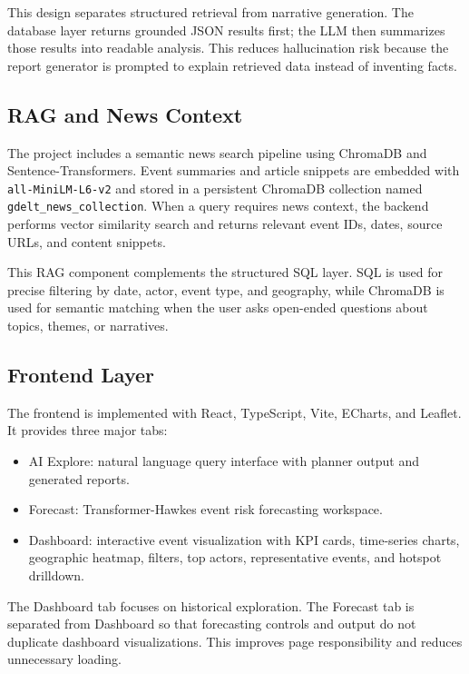\documentclass[11pt]{article}
\begin{document}
This design separates structured retrieval from narrative generation. The database layer returns grounded JSON results first; the LLM then summarizes those results into readable analysis. This reduces hallucination risk because the report generator is prompted to explain retrieved data instead of inventing facts.

\subsection{RAG and News Context}

The project includes a semantic news search pipeline using ChromaDB and Sentence-Transformers. Event summaries and article snippets are embedded with \texttt{all-MiniLM-L6-v2} and stored in a persistent ChromaDB collection named \texttt{gdelt\_news\_collection}. When a query requires news context, the backend performs vector similarity search and returns relevant event IDs, dates, source URLs, and content snippets.

This RAG component complements the structured SQL layer. SQL is used for precise filtering by date, actor, event type, and geography, while ChromaDB is used for semantic matching when the user asks open-ended questions about topics, themes, or narratives.

\subsection{Frontend Layer}

The frontend is implemented with React, TypeScript, Vite, ECharts, and Leaflet. It provides three major tabs:

\begin{itemize}
    \item AI Explore: natural language query interface with planner output and generated reports.
    \item Forecast: Transformer-Hawkes event risk forecasting workspace.
    \item Dashboard: interactive event visualization with KPI cards, time-series charts, geographic heatmap, filters, top actors, representative events, and hotspot drilldown.
\end{itemize}

The Dashboard tab focuses on historical exploration. The Forecast tab is separated from Dashboard so that forecasting controls and output do not duplicate dashboard visualizations. This improves page responsibility and reduces unnecessary loading.
\end{document}
